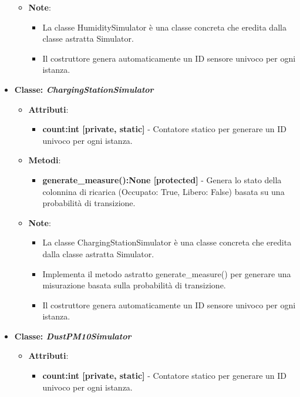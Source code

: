 \begin{itemize}
\begin{itemize}
\begin{itemize}
    \end{itemize}
    \item \textbf{Note}:
    \begin{itemize}
        \item La classe HumiditySimulator è una classe concreta che eredita dalla classe astratta Simulator.
        \item Il costruttore genera automaticamente un ID sensore univoco per ogni istanza.
    \end{itemize}
\end{itemize}
    \item{\textbf{Classe: \textit{ChargingStationSimulator}}}
    \begin{itemize}
        \item  \textbf{Attributi}: 
    \begin{itemize}
        \item \textbf{count:int [private, static]} - Contatore statico per generare un ID univoco per ogni istanza.
    \end{itemize}
    \item  \textbf{Metodi}:
    \begin{itemize}
        \item \textbf{generate\_measure():None [protected]} - Genera lo stato della colonnina di ricarica (Occupato: True, Libero: False) basata su una probabilità di transizione.
    \end{itemize}
    \item   \textbf{Note}:
    \begin{itemize}
        \item La classe ChargingStationSimulator è una classe concreta che eredita dalla classe astratta Simulator.
        \item Implementa il metodo astratto generate\_measure() per generare una misurazione basata sulla probabilità di transizione.
        \item Il costruttore genera automaticamente un ID sensore univoco per ogni istanza.
    \end{itemize}
\end{itemize}
    \item{\textbf{Classe: \textit{DustPM10Simulator}}}
    \begin{itemize}
        \item   \textbf{Attributi}: 
    \begin{itemize}
        \item \textbf{count:int [private, static]} - Contatore statico per generare un ID univoco per ogni istanza.

\end{itemize}
\end{itemize}
\end{itemize}
